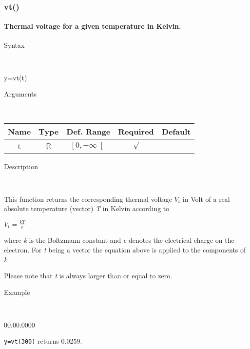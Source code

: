 \newpage
\subsubsection*{\hypertarget{vt}{}{\Large vt()}}


\paragraph{\label{par:vt}Thermal voltage for a given temperature in Kelvin.}

\begin{description}
\item [Syntax]~
\end{description}
y=vt(t)

\begin{description}
\item [Arguments]~
\end{description}
\begin{tabular}{|c|c|c|c|c|}
\hline 
Name&
Type&
Def. Range&
Required&
Default\tabularnewline
\hline
\hline 
t&
$\mathbb{R}$&
$\left[0,+\infty\right[$&
$\surd$&
\tabularnewline
\hline 
\end{tabular}

\begin{description}
\item [Description]~
\end{description}
This function returns the corresponding thermal voltage ${V_t}$ in Volt of a real absolute temperature
 (vector) \textit{T} in Kelvin according to

\medskip{}
${V_t}=\displaystyle \frac{kT}{e}$
\medskip{}

\noindent where \textit{k} is the Boltzmann constant and \textit{e} denotes the electrical charge on the electron.
For \textit{t} being a vector the equation above is applied
to the components of \textit{k}.

\noindent Please note that \textit{t} is always larger than or equal to zero.

\begin{description}
\item [Example]~
\end{description}
\begin{lyxlist}{00.00.0000}
\item [\texttt{y=vt(300)}]returns 0.0259.
\end{lyxlist}



